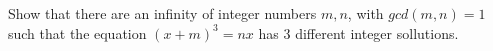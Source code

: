 Show that there are an infinity of integer numbers $m,n$, with $gcd(m,n)=1$ such that the equation $(x+m)^{3}=nx$ has 3 different integer sollutions.